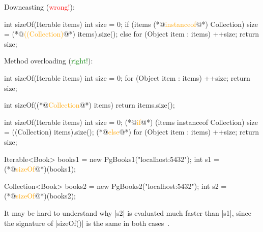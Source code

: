 \documentclass{article}
\begin{document}

\pptToc


\begin{pptWide}{2}
Downcasting (\textcolor{red}{wrong!}):\par
{\small\begin{ffcode}
int sizeOf(Iterable items) {
  int size = 0;
  if (items (*@\textcolor{orange}{instanceof}@*) Collection) {
    size = (*@\textcolor{orange}{((Collection)}@*) items).size();
  } else {
    for (Object item : items) {
      ++size;
    }
  }
  return size;
}
\end{ffcode}
}
\par\columnbreak\par
Method overloading (\textcolor{green}{right!}):\par
{\small\begin{ffcode}
int sizeOf(Iterable items) {
  int size = 0;
  for (Object item : items) {
    ++size;
  }
  return size;
}

int sizeOf((*@\textcolor{orange}{Collection}@*) items) {
  return items.size();
}
\end{ffcode}
}
\end{pptWide}
\par
\plush{}

\begin{pptWide}{2}
{\small\begin{ffcode}
int sizeOf(Iterable items) {
  int size = 0;
  (*@\textcolor{orange}{if}@*) (items instanceof Collection) {
    size = ((Collection) items).size();
  } (*@\textcolor{orange}{else}@*) {
    for (Object item : items) {
      ++size;
    }
  }
  return size;
}
\end{ffcode}
}
\par\columnbreak\par
{\small\begin{ffcode}
Iterable<Book> books1 =
  new PgBooks1("localhost:5432");
int s1 = (*@\textcolor{orange}{sizeOf}@*)(books1);

Collection<Book> books2 =
  new PgBooks2("localhost:5432");
int s2 = (*@\textcolor{orange}{sizeOf}@*)(books2);
\end{ffcode}
}
\end{pptWide}
\par
It may be hard to understand why |s2| is evaluated much faster than |s1|,
since the signature of |sizeOf()| is the same in both cases~\citep{bugayenko2015blog0402}.
\plush{}
\end{document}

